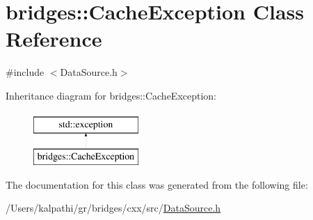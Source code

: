 \hypertarget{classbridges_1_1_cache_exception}{}\section{bridges\+::Cache\+Exception Class Reference}
\label{classbridges_1_1_cache_exception}


{\ttfamily \#include $<$Data\+Source.\+h$>$}

Inheritance diagram for bridges\+::Cache\+Exception\+:\begin{figure}[H]
\begin{center}
\leavevmode
\includegraphics[height=2.000000cm]{classbridges_1_1_cache_exception}
\end{center}
\end{figure}


The documentation for this class was generated from the following file\+:\begin{DoxyCompactItemize}
\item 
/\+Users/kalpathi/gr/bridges/cxx/src/\mbox{\hyperlink{_data_source_8h}{Data\+Source.\+h}}\end{DoxyCompactItemize}
